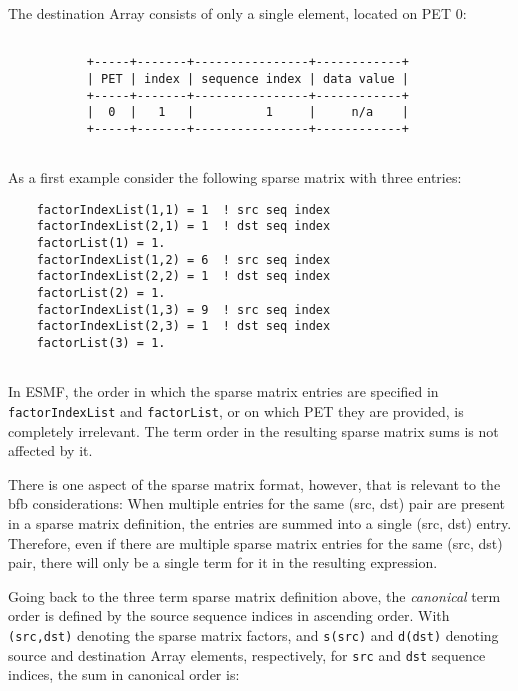    The destination Array consists of only a single element, located on PET 0:
  
   \begin{verbatim}
  
           +-----+-------+----------------+------------+
           | PET | index | sequence index | data value |
           +-----+-------+----------------+------------+
           |  0  |   1   |          1     |     n/a    |
           +-----+-------+----------------+------------+
  
   \end{verbatim} 

   As a first example consider the following sparse matrix with three entries: 

 \begin{verbatim}
    factorIndexList(1,1) = 1  ! src seq index
    factorIndexList(2,1) = 1  ! dst seq index
    factorList(1) = 1.
    factorIndexList(1,2) = 6  ! src seq index
    factorIndexList(2,2) = 1  ! dst seq index
    factorList(2) = 1.
    factorIndexList(1,3) = 9  ! src seq index
    factorIndexList(2,3) = 1  ! dst seq index
    factorList(3) = 1.
 
\end{verbatim}
 

   In ESMF, the order in which the sparse matrix entries are specified in 
   {\tt factorIndexList} and {\tt factorList}, or on which PET they
   are provided, is completely irrelevant. The term order in the resulting
   sparse matrix sums is not affected by it.
  
   There is one aspect of the sparse matrix format, however, that is relevant
   to the bfb considerations: When multiple entries for the same (src, dst)
   pair are present in a sparse matrix definition, the entries are summed
   into a single (src, dst) entry. Therefore, even if there are multiple
   sparse matrix entries for the same (src, dst) pair, there will only be a
   single term for it in the resulting expression.
  
   Going back to the three term sparse matrix definition above, the 
   {\em canonical} term order is defined by the source sequence indices in 
   ascending order. With {\tt (src,dst)} denoting the sparse matrix factors,
   and {\tt s(src)} and {\tt d(dst)} denoting source and destination Array
   elements, respectively, for {\tt src} and {\tt dst} sequence indices, the
   sum in canonical order is:
  
